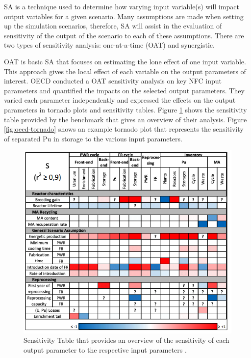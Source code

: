 \gls{SA} is a technique used to determine how 
varying input variable(s) will impact
output variables for a given scenario. 
Many assumptions are made when setting up the simulation scenarios, 
therefore, \gls{SA} will assist in the evaluation of
sensitivity of the output of the scenario to each of these 
assumptions.  
There are two types of sensitivity analysis: one-at-a-time (OAT)
and synergistic. 

OAT is basic \gls{SA} that focuses on estimating the lone effect 
of one input variable. 
This approach gives the local effect of each variable on the 
output parameters of interest. 
OECD conducted a OAT sensitivity analysis \cite{noauthor_effects_2017} 
on key \gls{NFC} input parameters
and quantified the impacts on the selected output parameters. 
They varied each parameter independently and expressed the effects 
on the output parameters in tornado plots and sensitivity tables. 
Figure \ref{fig:oecd-sensitivitytable} shows the sensitivity table
provided by the benchmark that gives an overview of their analysis. 
Figure \ref{fig:oecd-tornado} shows an example tornado plot that represents 
the sensitivity of separated Pu in storage to the various input parameters. 


\begin{figure}[]
	\begin{center}
		\includegraphics[scale=0.55]{./figures/oecd-sensitivitytable.png}
	\end{center}	
		\caption{Sensitivity Table that provides an overview of the sensitivity 
		of each output parameter to the respective input parameters \cite{noauthor_effects_2017}.}
	\label{fig:oecd-sensitivitytable}
\end{figure}

